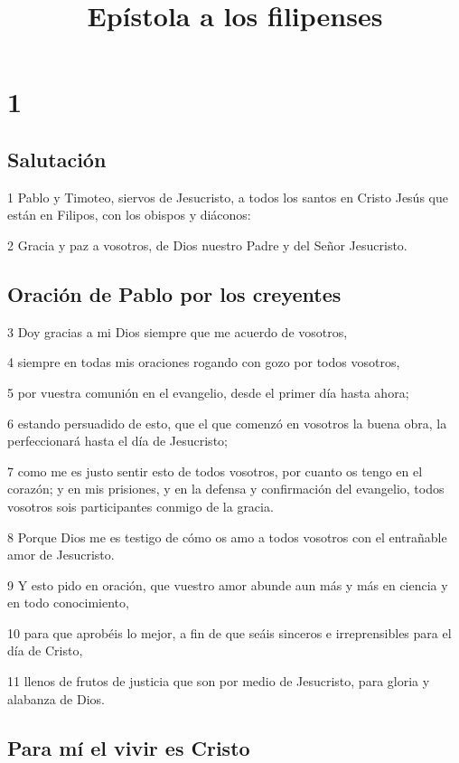 
\title{Epístola a los filipenses}

\chapter{1}

\section*{Salutación}

\par 1 Pablo y Timoteo, siervos de Jesucristo, a todos los santos en Cristo Jesús que están en Filipos, con los obispos y diáconos:
\par 2 Gracia y paz a vosotros, de Dios nuestro Padre y del Señor Jesucristo.

\section*{Oración de Pablo por los creyentes}

\par 3 Doy gracias a mi Dios siempre que me acuerdo de vosotros,
\par 4 siempre en todas mis oraciones rogando con gozo por todos vosotros,
\par 5 por vuestra comunión en el evangelio, desde el primer día hasta ahora;
\par 6 estando persuadido de esto, que el que comenzó en vosotros la buena obra, la perfeccionará hasta el día de Jesucristo;
\par 7 como me es justo sentir esto de todos vosotros, por cuanto os tengo en el corazón; y en mis prisiones, y en la defensa y confirmación del evangelio, todos vosotros sois participantes conmigo de la gracia.
\par 8 Porque Dios me es testigo de cómo os amo a todos vosotros con el entrañable amor de Jesucristo.
\par 9 Y esto pido en oración, que vuestro amor abunde aun más y más en ciencia y en todo conocimiento,
\par 10 para que aprobéis lo mejor, a fin de que seáis sinceros e irreprensibles para el día de Cristo,
\par 11 llenos de frutos de justicia que son por medio de Jesucristo, para gloria y alabanza de Dios.

\section*{Para mí el vivir es Cristo}

